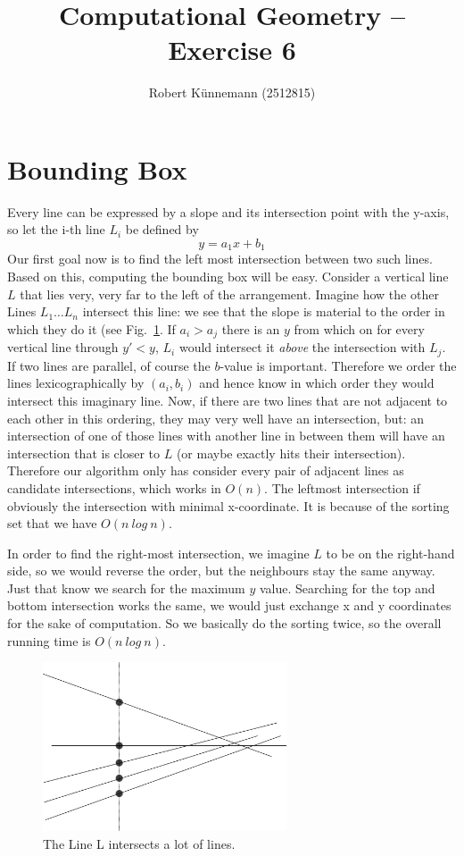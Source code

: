 \documentclass[a4paper]{scrartcl}
\title{Computational Geometry -- Exercise 6}
\author{Robert K\"unnemann (2512815)}
\begin{document}
\maketitle

\section*{Bounding Box}

Every line can be expressed by a slope and its intersection point with the y-axis, so let the i-th line $L_i$ be defined by
$$ y = a_1x + b_1$$
Our first goal now is to find the left most intersection between two such lines. Based on this, computing the bounding box will be easy. Consider a vertical line $L$ that lies very, very far to the left of the arrangement. Imagine how the other Lines $L_1 \dots L_n$ intersect this line: we see that the slope is material to the order in which they do it (see Fig.~\ref{fig:task1}. If $a_i > a_j$ there is an $y$ from which on for every vertical line through $y'<y$, $L_i$ would intersect it \emph{above} the intersection with $L_j$. If two lines are parallel, of course the $b$-value is important. Therefore we order the lines lexicographically by $(a_i, b_i)$ and hence know in which order they would intersect this imaginary line. Now, if there are two lines that are not adjacent to each other in this ordering, they may very well have an intersection, but: an intersection of one of those lines with another line in between them will have an intersection that is closer to $L$ (or maybe exactly hits their intersection). Therefore our algorithm only has consider every pair of adjacent lines as candidate intersections, which works in $O(n)$. The leftmost intersection if obviously the intersection with minimal x-coordinate. It is because of the sorting set that we have $O(n~log~n)$. 

In order to find the right-most intersection, we imagine $L$ to be on the right-hand side, so we would reverse the order, but the neighbours stay the same anyway. Just that know we search for the maximum $y$ value. Searching for the top and bottom intersection works the same, we would just exchange x and y coordinates for the sake of computation. So we basically do the sorting twice, so the overall running time is $O(n~log~n)$.
\begin{figure}[h]
  \begin{center}
    \includegraphics[height=5cm]{pic/task1.eps}
  \end{center}
  \caption{The Line L intersects a lot of lines.}
  \label{fig:task1}
\end{figure}
\end{document}
